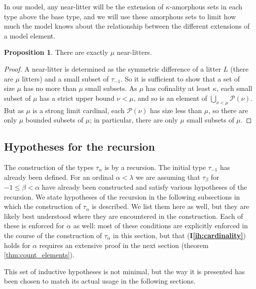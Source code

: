 \documentclass{article}
\theoremstyle{definition}
\newtheorem{proposition}[theorem]{Proposition}
\theoremstyle{remark}
\newcommand{\ihref}[1]{(\textbf{I\ref{#1}})}
\begin{document}
In our model, any near-litter will be the extension of $\kappa$-amorphous sets in each type above the base type, and we will use these amorphous sets to limit how much the model knows about the relationship between the different extensions of a model element.

\begin{proposition}\label{def:count_near_litters}
There are exactly $\mu$ near-litters.

\end{proposition}

\begin{proof}
A near-litter is determined as the symmetric difference of a litter $L$ (there are $\mu$ litters) and a small subset of
$\tau_{-1}$.
So it is sufficient to show that a set of size $\mu$ has no more than $\mu$ small subsets.
As $\mu$ has cofinality at least $\kappa$, each small subset of $\mu$ has a strict upper bound $\nu<\mu$, and so is an element of $\bigcup_{\nu < \mu} \mathcal P(\nu)$.
But as $\mu$ is a strong limit cardinal, each $\mathcal P(\nu)$ has size less than $\mu$, so there are only $\mu$ bounded subsets of $\mu$; in particular, there are only $\mu$ small subsets of $\mu$.
\end{proof}

\subsection{Hypotheses for the recursion}\label{ss:hypotheses}

The construction of the types $\tau_\alpha$ is by a recursion.  The initial type $\tau_{-1}$ has already been defined.  For an ordinal $\alpha<\lambda$ we are assuming that $\tau_\beta$ for $-1\leq \beta<\alpha$ have already been constructed and satisfy various hypotheses of the recursion.  We state hypotheses of the recursion in the following subsections in which the construction of $\tau_\alpha$ is described.  We list them here as well, but they are likely best understood where they are encountered in the construction.  Each of these is enforced for $\alpha$ as well:  most of these conditions are explicitly enforced in the course of the construction of $\tau_\alpha$ in this section, but that \ihref{ih:cardinality} holds for $\alpha$ requires an extensive proof in the next section (theorem \ref{thm:count_elements}).

This set of inductive hypotheses is not minimal, but the way it is presented has been chosen to match its actual usage in the following sections.
\end{document}
